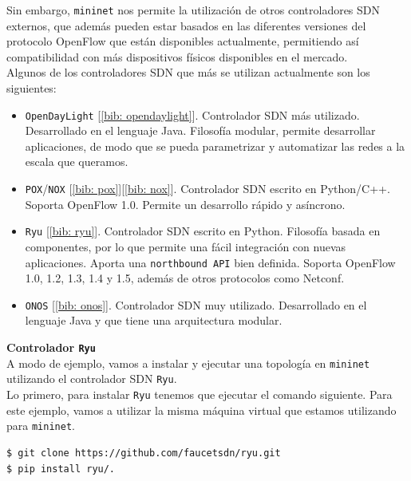 \documentclass[a4paper, oneside, 12pt]{book}
\begin{document}
	\noindent Sin embargo, \texttt{mininet} nos permite la utilización de otros controladores SDN externos, que además pueden estar basados en las diferentes versiones del protocolo OpenFlow que están disponibles actualmente, permitiendo así compatibilidad con más dispositivos físicos disponibles en el mercado. \\
	
	\noindent Algunos de los controladores SDN que más se utilizan actualmente son los siguientes:
	\begin{itemize}
		\item \texttt{OpenDayLight} [\ref{bib: opendaylight}]. Controlador SDN más utilizado. Desarrollado en el lenguaje Java. Filosofía modular, permite desarrollar aplicaciones, de modo que se pueda parametrizar y automatizar las redes a la escala que queramos.
		
		\item \texttt{POX}/\texttt{NOX} [\ref{bib: pox}][\ref{bib: nox}]. Controlador SDN escrito en Python/C++. Soporta OpenFlow 1.0. Permite un desarrollo rápido y asíncrono.
		
		\item \texttt{Ryu} [\ref{bib: ryu}]. Controlador SDN escrito en Python. Filosofía basada en componentes, por lo que permite una fácil integración con nuevas aplicaciones. Aporta una \texttt{northbound API} bien definida. Soporta OpenFlow 1.0, 1.2, 1.3, 1.4 y 1.5, además de otros protocolos como Netconf.
				
		\item \texttt{ONOS} [\ref{bib: onos}]. Controlador SDN muy utilizado. Desarrollado en el lenguaje Java y que tiene una arquitectura modular. 
	\end{itemize}

	\vspace{20px}
	\noindent \textbf{Controlador \texttt{Ryu}}\\

	\noindent A modo de ejemplo, vamos a instalar y ejecutar una topología en \texttt{mininet} utilizando el controlador SDN \texttt{Ryu}.  \\
	
	\noindent Lo primero, para instalar \texttt{Ryu} tenemos que ejecutar el comando siguiente. Para este ejemplo, vamos a utilizar la misma máquina virtual que estamos utilizando para \texttt{mininet}.
	
	\begin{verbatim}
$ git clone https://github.com/faucetsdn/ryu.git
$ pip install ryu/.
	\end{verbatim}
\end{document}
